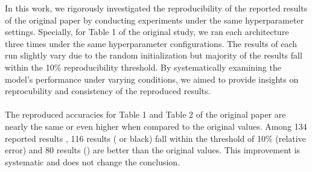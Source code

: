 In this work, we rigorously investigated the reproducibility of the reported results of the original paper by conducting experiments under the same hyperparameter settings. Specially, for Table 1 of the original study, we ran each architecture three times under the same hyperparameter configurations. The results of each run slightly vary due to the random initialization but majority of the results fall within the 10\% reproducibility threshold. By systematically examining the model's performance under varying conditions, we aimed to provide insights on reprocubility and consistency of the reproduced results. \\\\
The reproduced accuracies for Table 1  and Table 2 of the original paper are nearly the same or even higher when compared to the original values. Among 134 reported results , 116 results ( or black) fall within the threshold of 10\% (relative error) and 80 results () are better than the original values. This improvement is systematic and does not change the conclusion. 
